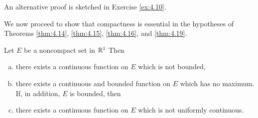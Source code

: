 An alternative proof is sketched in Exercise \ref{ex:4.10}.

We now proceed to show that compactness is essential in the hypotheses
of Theorems \ref{thm:4.14}, \ref{thm:4.15}, \ref{thm:4.16}, and \ref{thm:4.19}.

\begin{thm}
    \label{thm:4.20}
    Let $E$ be a noncompact set in ${\protect\mathbb R}^{1}$ Then
    \begin{enumerate}[(a)]
        \item there exists a continuous function on $E$ which is not bounded,
        \item there exists a continuous and bounded function on $E$ which has no maximum.\\
              If, in addition, $E$ is bounded, then
        \item there exists a continuous function on $E$ which is not uniformly continuous.
    \end{enumerate}
\end{thm}
